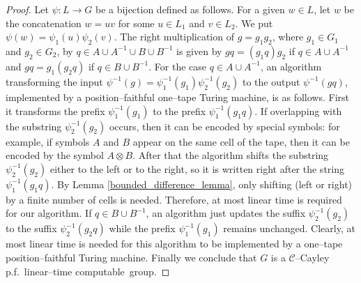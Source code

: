 \documentclass[article,12pt]{elsarticle}
\newcommand\ClinearC{$\mathcal{C}$--Cayley p.f.~linear--time computable}
\begin{document}
\begin{proof}
	Let $\psi : L \rightarrow G$ be a bijection defined 
	as follows. For a given $w \in L$, let $w$ be the 
	concatenation $w=uv$ for some $u \in L_1$ and 
	$v \in L_2$. We put 
	$\psi (w) = \psi_1(u)\psi_2(v)$. The right 
	multiplication of $g = g_1 g_2$, where $g_1 \in G_1$ 
	and $g_2 \in G_2$, by 
	$q \in A \cup A^{-1} \cup B \cup B^{-1}$ 
	is given by 
	$gq = (g_1 q)g_2$ if $q \in A \cup A^{-1}$ and 
	$gq = g_1 (g_2 q)$ if $q \in B \cup B^{-1}$. 
	For the case $q \in A \cup A^{-1}$, an algorithm 
	transforming the input $\psi^{-1}(g) = 
	\psi_1 ^{-1}(g_1) \psi_2 ^{-1}(g_2)$ to the 
	output $\psi^{-1}(gq)$, implemented by a position--faithful one--tape 
	Turing machine, is as follows. First 
	it transforms the prefix
	$\psi_1^{-1}(g_1)$ to the prefix 
	$\psi_1^{-1}(g_1 q)$.   
	If overlapping with the substring 
	$\psi_2^{-1}(g_2)$ occurs, then it can be encoded by 
	special symbols: for example, if symbols 
	$A$ and $B$ appear on the same cell of the tape,
	then it can be encoded by the symbol 
	$A \otimes B$.      
	After that the 
	algorithm shifts the substring $\psi_2^{-1}(g_2)$ 
	either to the left or to the right, so it is written
	right after the string $\psi_1 ^{-1}(g_1q)$.        
	By Lemma \ref{bounded_difference_lemma}, 
	only shifting (left or right) by a finite
	number of cells is needed.  Therefore, 
	at most linear time is required for our algorithm. 
	If  $q \in B \cup B^{-1}$, an algorithm just 
	updates the suffix $\psi_2 ^{-1}(g_2)$ 
	to the suffix  $\psi_2 ^{-1}(g_2 q)$ while 
	the prefix $\psi_1 ^{-1}(g_1)$ remains unchanged.   
	Clearly, at most linear time is needed for this 
	algorithm to be implemented by a one--tape 
	position--faithful Turing machine.  
	Finally we conclude that  $G$ is a \ClinearC\ group.                       
\end{proof}
\end{document}
